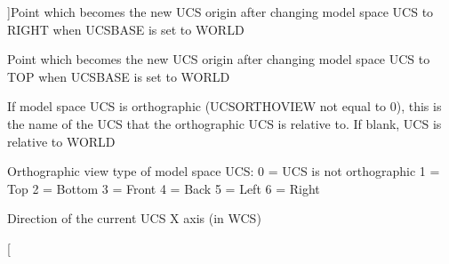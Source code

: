 \begin{Desc}
\begin{description}
{}]Point which becomes the new U\+CS origin after changing model space U\+CS to R\+I\+G\+HT when U\+C\+S\+B\+A\+SE is set to W\+O\+R\+LD \item[{\em 
U\+C\+S\+O\+R\+G\+T\+OP\hypertarget{class_c_a_d_header_abd894aab7aa85b4c4634e67fb93d6886a9badade58920b72ec3bcd35c44bc1e66}{}\label{class_c_a_d_header_abd894aab7aa85b4c4634e67fb93d6886a9badade58920b72ec3bcd35c44bc1e66}
}]Point which becomes the new U\+CS origin after changing model space U\+CS to T\+OP when U\+C\+S\+B\+A\+SE is set to W\+O\+R\+LD \item[{\em 
U\+C\+S\+O\+R\+T\+H\+O\+R\+EF\hypertarget{class_c_a_d_header_abd894aab7aa85b4c4634e67fb93d6886a34b979b2dbe7209cf244a6995e0b0869}{}\label{class_c_a_d_header_abd894aab7aa85b4c4634e67fb93d6886a34b979b2dbe7209cf244a6995e0b0869}
}]If model space U\+CS is orthographic (U\+C\+S\+O\+R\+T\+H\+O\+V\+I\+EW not equal to 0), this is the name of the U\+CS that the orthographic U\+CS is relative to. If blank, U\+CS is relative to W\+O\+R\+LD \item[{\em 
U\+C\+S\+O\+R\+T\+H\+O\+V\+I\+EW\hypertarget{class_c_a_d_header_abd894aab7aa85b4c4634e67fb93d6886a0284925d4cba45f471d418c3e315a82a}{}\label{class_c_a_d_header_abd894aab7aa85b4c4634e67fb93d6886a0284925d4cba45f471d418c3e315a82a}
}]Orthographic view type of model space U\+CS\+: 0 = U\+CS is not orthographic 1 = Top 2 = Bottom 3 = Front 4 = Back 5 = Left 6 = Right \item[{\em 
U\+C\+S\+X\+D\+IR\hypertarget{class_c_a_d_header_abd894aab7aa85b4c4634e67fb93d6886ac52ea9b5dc1a62e2906d519c9ed3144b}{}\label{class_c_a_d_header_abd894aab7aa85b4c4634e67fb93d6886ac52ea9b5dc1a62e2906d519c9ed3144b}
}]Direction of the current U\+CS X axis (in W\+CS) \item[{\em 
}
\end{description}
\end{Desc}

